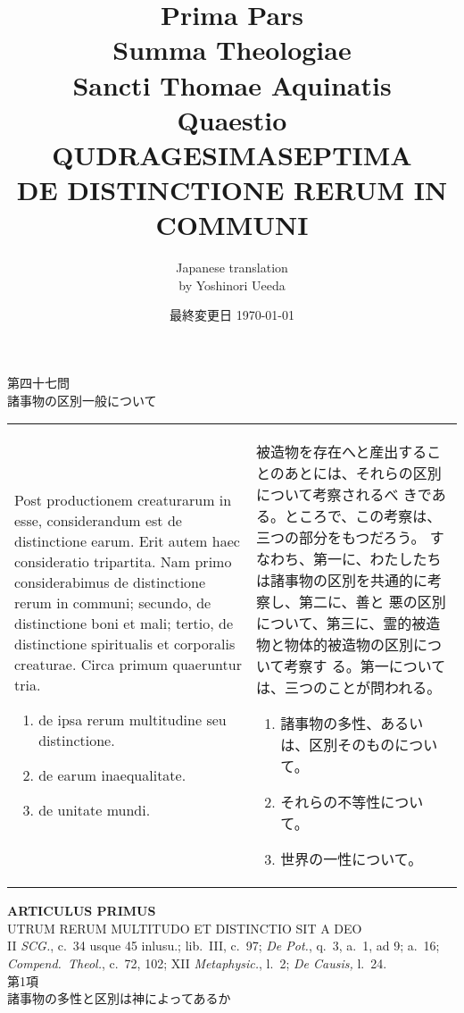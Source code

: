 \documentclass[10pt]{jsarticle} %
\title{{\bf Prima Pars}\\{\HUGE Summa Theologiae}\\Sancti Thomae
Aquinatis\\Quaestio QUDRAGESIMASEPTIMA\\{\bf DE DISTINCTIONE RERUM IN COMMUNI}}
\author{Japanese translation\\by Yoshinori {\sc Ueeda}}
\date{最終変更日 \today}
\begin{document}
\maketitle

\begin{center}
 {\Large 第四十七問\\諸事物の区別一般について}
\end{center}
\begin{longtable}{p{21em}p{21em}}



{\huge P}{\sc ost} productionem creaturarum in esse,
considerandum est de distinctione earum. Erit autem haec consideratio
tripartita. Nam primo considerabimus de distinctione rerum in communi;
secundo, de distinctione boni et mali; tertio, de distinctione
spiritualis et corporalis creaturae. Circa primum quaeruntur
tria. 
\begin{enumerate}
 \item de ipsa rerum multitudine seu distinctione. 
 \item de earum inaequalitate. 
 \item de unitate mundi.
\end{enumerate}

&
被造物を存在へと産出することのあとには、それらの区別について考察されるべ
 きである。ところで、この考察は、三つの部分をもつだろう。
すなわち、第一に、わたしたちは諸事物の区別を共通的に考察し、第二に、善と
 悪の区別について、第三に、霊的被造物と物体的被造物の区別について考察す
 る。第一については、三つのことが問われる。
\begin{enumerate}
 \item 諸事物の多性、あるいは、区別そのものについて。
 \item それらの不等性について。
 \item 世界の一性について。
\end{enumerate}

\end{longtable}
\newpage
{}

\begin{center}
 {\Large {\bf ARTICULUS PRIMUS}}\\
 {\large UTRUM RERUM MULTITUDO ET DISTINCTIO SIT A DEO}\\
 {\footnotesize II {\it SCG.}, c.~34 usque 45 inlusu.; lib.~III, c.~97;
 {\it De Pot.}, q.~3, a.~1, ad 9; a.~16; {\it Compend.~Theol.}, c.~72, 102;
 XII {\it Metaphysic.}, l.~2; {\it De Causis,} l.~24.}\\
{\Large 第1項\\諸事物の多性と区別は神によってあるか}
\end{center}
\end{document}
